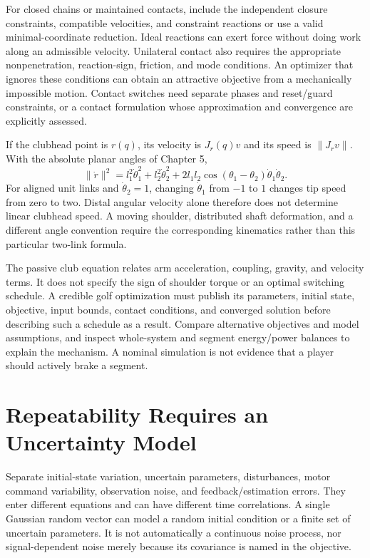 \documentclass[12pt, openany]{book}
\theoremstyle{plain}
\begin{document}
For closed chains or maintained contacts, include the independent closure
constraints, compatible velocities, and constraint reactions or use a valid
minimal-coordinate reduction. Ideal reactions can exert force without doing
work along an admissible velocity. Unilateral contact also requires the
appropriate nonpenetration, reaction-sign, friction, and mode conditions.
An optimizer that ignores these conditions can obtain an attractive objective
from a mechanically impossible motion. Contact switches need separate phases
and reset/guard constraints, or a contact formulation whose approximation
and convergence are explicitly assessed.

If the clubhead point is $r(q)$, its velocity is $J_r(q)v$ and its speed is
$\|J_rv\|$. With the absolute planar angles of Chapter 5,
\begin{equation}\label{eq:ocp_clubhead_speed}
 \|\dot r\|^2=l_1^2\dot\theta_1^2+l_2^2\dot\theta_2^2
 +2l_1l_2\cos(\theta_1-\theta_2)\dot\theta_1\dot\theta_2.
\end{equation}
For aligned unit links and $\dot\theta_2=1$, changing $\dot\theta_1$ from
$-1$ to $1$ changes tip speed from zero to two. Distal angular velocity
alone therefore does not determine linear clubhead speed. A moving shoulder,
distributed shaft deformation, and a different angle convention require the
corresponding kinematics rather than this particular two-link formula.

The passive club equation relates arm acceleration, coupling, gravity, and
velocity terms. It does not specify the sign of shoulder torque or an
optimal switching schedule. A credible golf optimization must publish its
parameters, initial state, objective, input bounds, contact conditions, and
converged solution before describing such a schedule as a result. Compare
alternative objectives and model assumptions, and inspect whole-system
and segment energy/power balances to explain the mechanism. A nominal
simulation is not evidence that a player should actively brake a segment.

\section{Repeatability Requires an Uncertainty Model}

Separate initial-state variation, uncertain parameters, disturbances, motor
command variability, observation noise, and feedback/estimation errors.
They enter different equations and can have different time correlations.
A single Gaussian random vector can model a random initial condition or a
finite set of uncertain parameters. It is not automatically a continuous
noise process, nor signal-dependent noise merely because its covariance is
named in the objective.
\end{document}
